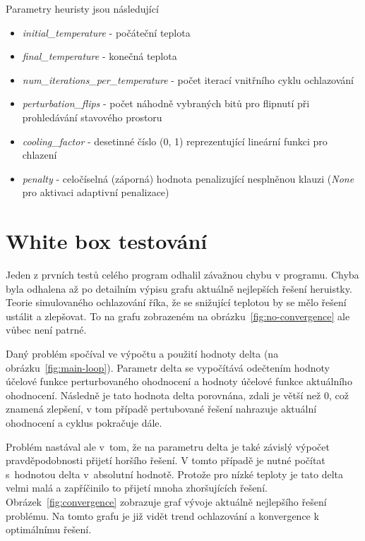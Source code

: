\documentclass[twoside,twocolumn]{article}
\begin{document}
    Parametry heuristy jsou následující

    \begin{itemize}
        \item \emph{initial\_temperature} - počáteční teplota
        \item \emph{final\_temperature} - konečná teplota
        \item \emph{num\_iterations\_per\_temperature} - počet iterací vnitřního cyklu ochlazování
        \item \emph{perturbation\_flips} - počet náhodně vybraných bitů pro flipnutí při prohledávání stavového prostoru
        \item \emph{cooling\_factor} - desetinné číslo (0, 1) reprezentující lineární funkci pro chlazení
        \item \emph{penalty} - celočíselná (záporná) hodnota penalizující nesplněnou klauzi (\emph{None} pro aktivaci adaptivní penalizace)
    \end{itemize}


    \section{White box testování}

    Jeden z prvních testů celého program odhalil závažnou chybu v programu.
    Chyba byla odhalena až po detailním výpisu grafu aktuálně nejlepších řešení heruistky.
    Teorie simulovaného ochlazování říka, že se snižující teplotou by se mělo řešení ustálit a zlepšovat.
    To na grafu zobrazeném na obrázku~\ref{fig:no-convergence} ale vůbec není patrné.

    Daný problém spočíval ve výpočtu a použití hodnoty delta (na obrázku~\ref{fig:main-loop}).
    Parametr delta se vypočítává odečtením hodnoty účelové funkce perturbovaného ohodnocení a hodnoty účelové funkce
    aktuálního ohodnocení.
    Následně je tato hodnota delta porovnána, zdali je větší než 0, což znamená zlepšení, v tom případě pertubované řešení
    nahrazuje aktuální ohodnocení a cyklus pokračuje dále.

    Problém nastával ale v~tom, že na parametru delta je také závislý výpočet pravděpodobnosti přijetí horšího řešení.
    V tomto případě je nutné počítat s~hodnotou delta v~absolutní hodnotě.
    Protože pro nízké teploty je tato delta velmi malá a zapříčinilo to přijetí mnoha zhoršujících řešení.
    Obrázek~\ref{fig:convergence} zobrazuje graf vývoje aktuálně nejlepšího řešení problému.
    Na tomto grafu je již vidět trend ochlazování a konvergence k optimálnímu řešení.
\end{document}
